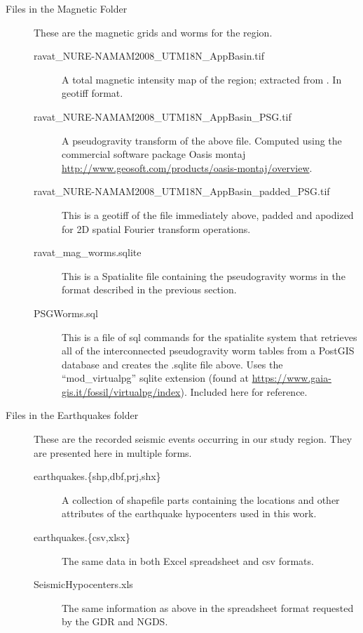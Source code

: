 \documentclass[extra]{article}
\begin{document}
\begin{description}
\item [Files in the Magnetic Folder] These are the magnetic grids and worms for the region.
\begin{description}
\item [ravat\_NURE-NAMAM2008\_UTM18N\_AppBasin.tif] A total magnetic intensity map of the region; extracted from \citet{RavatEtAl09}. In geotiff format.
\item [ravat\_NURE-NAMAM2008\_UTM18N\_AppBasin\_PSG.tif] A pseudogravity transform \citep[ see, eg.][pp. 343ff]{Blakely} of the above file. Computed using the commercial software package Oasis montaj \url{http://www.geosoft.com/products/oasis-montaj/overview}.
\item [ravat\_NURE-NAMAM2008\_UTM18N\_AppBasin\_padded\_PSG.tif] This is a geotiff of the file immediately above, padded and apodized for 2D spatial Fourier transform operations. 
\item [ravat\_mag\_worms.sqlite] This is a Spatialite \citep{Spatialite2015} file containing the  pseudogravity worms in the format described in the previous section.
\item[PSGWorms.sql] This is a file of sql commands for the spatialite system \citep{Spatialite2015} that retrieves all of the interconnected pseudogravity worm tables from a PostGIS database and creates the .sqlite file above. Uses the ``mod\_virtualpg'' sqlite extension (found at \url{https://www.gaia-gis.it/fossil/virtualpg/index}). Included here for reference. 
\end{description}


\item[Files in the Earthquakes folder] These are the recorded seismic events occurring in our study region. They are presented here in multiple forms. 
\begin{description}
\item [earthquakes.\{shp,dbf,prj,shx\}] A collection of shapefile parts containing the locations and other attributes of the earthquake hypocenters used in this work.
\item[earthquakes.\{csv,xlsx\}] The same data in both Excel spreadsheet and csv formats.
\item[SeismicHypocenters.xls] The same information as above in the spreadsheet format requested by the GDR and NGDS. 
\end{description}


\end{description}
\end{document}
